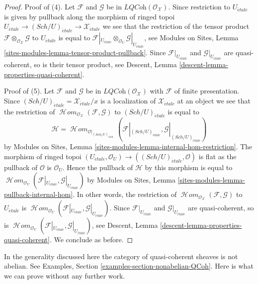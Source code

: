 \documentclass{stacks-project}
\theoremstyle{plain}
\theoremstyle{definition}
\theoremstyle{remark}
\numberwithin{equation}{subsection}
\def\SheafHom{\mathop{\mathcal{H}\!\mathit{om}}\nolimits}
\def\Sch{\mathit{Sch}}
\def\etale{{\acute{e}tale}}
\begin{document}
\begin{proof}
\medskip\noindent
Proof of (4). Let $\mathcal{F}$ and $\mathcal{G}$ be in
$\textit{LQCoh}(\mathcal{O}_\mathcal{X})$. Since restriction to $U_\etale$
is given by pullback along the morphism of ringed topoi
$U_\etale \to (\Sch/U)_\etale \to \mathcal{X}_\etale$
we see that the restriction of the tensor product
$\mathcal{F} \otimes_{\mathcal{O}_\mathcal{X}} \mathcal{G}$
to $U_\etale$ is equal to
$\mathcal{F}|_{U_\etale} \otimes_{\mathcal{O}_U} \mathcal{G}|_{U_\etale}$,
see Modules on Sites, Lemma \ref{sites-modules-lemma-tensor-product-pullback}.
Since $\mathcal{F}|_{U_\etale}$ and $\mathcal{G}|_{U_\etale}$
are quasi-coherent, so is their tensor product, see
Descent, Lemma \ref{descent-lemma-properties-quasi-coherent}.

\medskip\noindent
Proof of (5). Let $\mathcal{F}$ and $\mathcal{G}$ be in
$\textit{LQCoh}(\mathcal{O}_\mathcal{X})$ with $\mathcal{F}$
of finite presentation. Since
$(\Sch/U)_\etale = \mathcal{X}_\etale/x$
is a localization of $\mathcal{X}_\etale$ at an object
we see that the restriction of
$\SheafHom_{\mathcal{O}_\mathcal{X}}(\mathcal{F}, \mathcal{G})$
to $(\Sch/U)_\etale$ is equal to
$$
\mathcal{H} =
\SheafHom_{\mathcal{O}|_{(\Sch/U)_\etale}}(
\mathcal{F}|_{(\Sch/U)_\etale}, \mathcal{G}|_{(\Sch/U)_\etale})
$$
by Modules on Sites, Lemma \ref{sites-modules-lemma-internal-hom-restriction}.
The morphism of ringed topoi
$(U_\etale, \mathcal{O}_U) \to ((\Sch/U)_\etale, \mathcal{O})$
is flat as the pullback of $\mathcal{O}$ is $\mathcal{O}_U$.
Hence the pullback of $\mathcal{H}$ by this morphism is equal to
$\SheafHom_{\mathcal{O}_U}(\mathcal{F}|_{U_\etale}, \mathcal{G}|_{U_\etale})$
by Modules on Sites, Lemma \ref{sites-modules-lemma-pullback-internal-hom}.
In other words, the restriction of
$\SheafHom_{\mathcal{O}_\mathcal{X}}(\mathcal{F}, \mathcal{G})$
to $U_\etale$ is
$\SheafHom_{\mathcal{O}_U}(\mathcal{F}|_{U_\etale}, \mathcal{G}|_{U_\etale})$.
Since $\mathcal{F}|_{U_\etale}$ and $\mathcal{G}|_{U_\etale}$
are quasi-coherent, so is
$\SheafHom_{\mathcal{O}_U}(\mathcal{F}|_{U_\etale}, \mathcal{G}|_{U_\etale})$,
see Descent, Lemma \ref{descent-lemma-properties-quasi-coherent}.
We conclude as before.
\end{proof}

\noindent
In the generality discussed here the category of quasi-coherent sheaves
is not abelian. See Examples, Section \ref{examples-section-nonabelian-QCoh}.
Here is what we can prove without any further work.
\end{document}
